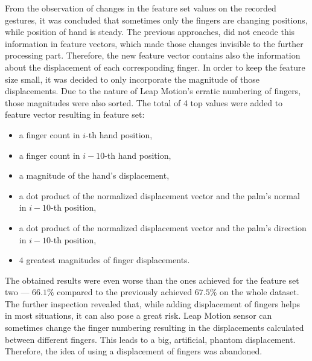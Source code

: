 From the observation of changes in the feature set values on the recorded gestures, it was concluded that sometimes only the fingers are changing positions, while position of hand is steady.
The previous approaches, did not encode this information in feature vectors, which made those changes invisible to the further processing part.
Therefore, the new feature vector contains also the information about the displacement of each corresponding finger.
In order to keep the feature size small, it was decided to only incorporate the magnitude of those displacements. 
Due to the nature of Leap Motion's erratic numbering of fingers, those magnitudes were also sorted.
The total of 4 top values were added to feature vector resulting in feature set:
\begin{itemize}
\item a finger count in $i$-th hand position,
\item a finger count in $i-10$-th hand position,
\item a magnitude of the hand's displacement,
\item a dot product of the normalized displacement vector and the palm's normal in $i-10$-th position,
\item a dot product of the normalized displacement vector and the palm's direction in $i-10$-th position,
\item $4$ greatest magnitudes of finger displacements.
\end{itemize}
The obtained results were even worse than the ones achieved for the feature set two --- $66.1\%$ compared to the previously achieved $67.5\%$ on the whole dataset. 
The further inspection revealed that, while adding displacement of fingers helps in most situations, it can also pose a great risk.
Leap Motion sensor can sometimes change the finger numbering resulting in the displacements calculated between different fingers.
This leads to a big, artificial, phantom displacement.
Therefore, the idea of using a displacement of fingers was abandoned.
 
